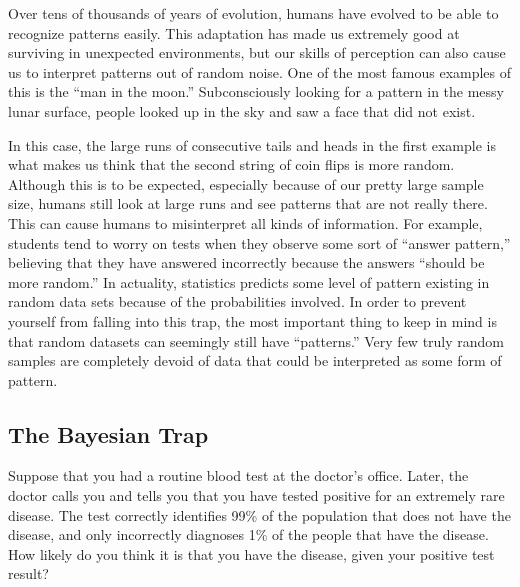 Over tens of thousands of years of evolution, humans have evolved to be able to recognize patterns easily. This adaptation has made us extremely good at surviving in unexpected environments, but our skills of perception can also cause us to interpret patterns out of random noise. One of the most famous examples of this is the “man in the moon.” Subconsciously looking for a pattern in the messy lunar surface, people looked up in the sky and saw a face that did not exist. 

In this case, the large runs of consecutive tails and heads in the first example is what makes us think that the second string of coin flips is more random. Although this is to be expected, especially because of our pretty large sample size, humans still look at large runs and see patterns that are not really there. This can cause humans to misinterpret all kinds of information. For example, students tend to worry on tests when they observe some sort of “answer pattern,” believing that they have answered incorrectly because the answers “should be more random.” In actuality, statistics predicts some level of pattern existing in random data sets because of the probabilities involved. In order to prevent yourself from falling into this trap, the most important thing to keep in mind is that random datasets can seemingly still have “patterns.” Very few truly random samples are completely devoid of data that could be interpreted as some form of pattern.

\subsection*{The Bayesian Trap}

Suppose that you had a routine blood test at the doctor’s office. Later, the doctor calls you and tells you that you have tested positive for an extremely rare disease. The test correctly identifies 99\% of the population that does not have the disease, and only incorrectly diagnoses 1\% of the people that have the disease. How likely do you think it is that you have the disease, given your positive test result?

